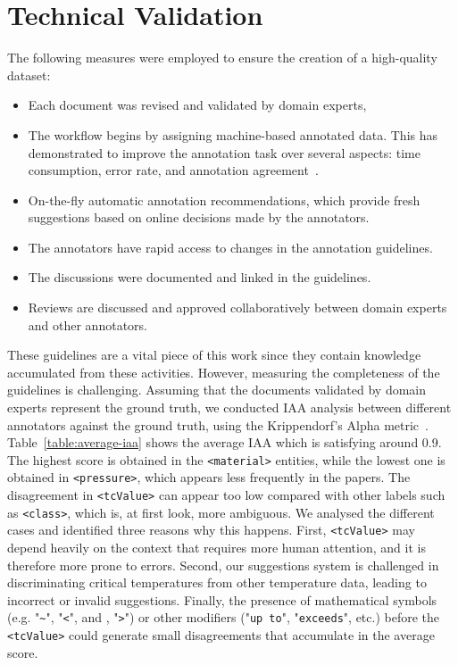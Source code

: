 \documentclass[fleqn,10pt]{wlscirep}
\begin{document}
\label{sec:technical-validation}
\section*{Technical Validation} 
The following measures were employed to ensure the creation of a high-quality dataset: 
\begin{itemize}
    \item Each document was revised and validated by domain experts, 
    \item The workflow begins by assigning machine-based annotated data. This has demonstrated to improve the annotation task over several aspects: time consumption, error rate, and annotation agreement~\cite{Fort2010InfluenceOP,Nvol2011SemiautomaticSA,Lingren2014EvaluatingTI}.
    \item On-the-fly automatic annotation recommendations, which provide fresh suggestions based on online decisions made by the annotators.
    \item The annotators have rapid access to changes in the annotation guidelines.
    \item The discussions were documented and linked in the guidelines. 
    \item Reviews are discussed and approved collaboratively between domain experts and other annotators.
\end{itemize}

These guidelines are a vital piece of this work since they contain knowledge accumulated from these activities.
However, measuring the completeness of the guidelines is challenging. 
Assuming that the documents validated by domain experts represent the ground truth, we conducted IAA analysis between different annotators against the ground truth, using the Krippendorf's Alpha metric~\cite{Krippendorff2004ReliabilityIC}.
Table~\ref{table:average-iaa} shows the average IAA which is satisfying around 0.9. 
The highest score is obtained in the \texttt{<material>} entities, while the lowest one is obtained in \texttt{<pressure>}, which appears less frequently in the papers. 
The disagreement in \texttt{<tcValue>} can appear too low compared with other labels such as \texttt{<class>}, which is, at first look, more ambiguous. 
We analysed the different cases and identified three reasons why this happens. 
First, \texttt{<tcValue>} may depend heavily on the context that requires more human attention, and it is therefore more prone to errors. 
Second, our suggestions system is challenged in discriminating critical temperatures from other temperature data, leading to incorrect or invalid suggestions. 
Finally, the presence of mathematical symbols (e.g. "\texttt{\~}", "\texttt{<}", and , "\texttt{>}") or other modifiers ("\texttt{up to}", "\texttt{exceeds}", etc.) before the \texttt{<tcValue>} could generate small disagreements that accumulate in the average score. 
\end{document}
